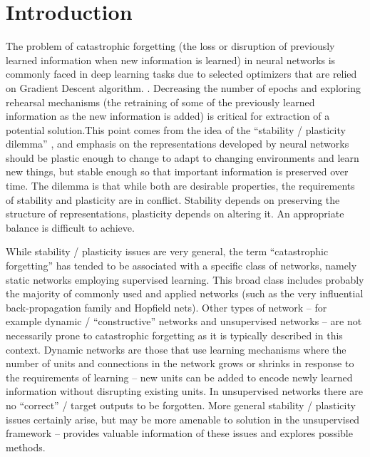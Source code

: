 \documentclass{article}
\begin{document}
\section{Introduction}
The problem of catastrophic forgetting (the loss or disruption of previously learned information when new information is learned) in neural networks is commonly faced in deep learning tasks due to selected optimizers that are relied on Gradient Descent algorithm. 
\cite{rebuffi2017icarl,hou2019learning,kang2022class}. Decreasing the number of epochs and exploring rehearsal mechanisms (the retraining of some of the previously learned information as the new information is added) is critical for extraction of a potential solution.This point comes from the idea of the “stability / plasticity dilemma” \cite{grossberg1987competitive,carpenter1988art}, and emphasis on the representations developed by neural networks should be plastic enough to change to adapt to changing environments and learn new things, but stable enough so that important information is preserved over time. The dilemma is that while both are desirable properties, the requirements of stability and plasticity are in conflict. Stability depends on preserving the structure of representations, plasticity depends on altering it. An appropriate balance is difficult to achieve.

While stability / plasticity issues are very general, the term “catastrophic forgetting”
has tended to be associated with a specific class of networks, namely static networks
employing supervised learning. This broad class includes probably the majority of
commonly used and applied networks (such as the very influential back-propagation
family and Hopfield nets). Other types of network – for example
dynamic / “constructive” networks and unsupervised networks – are not necessarily
prone to catastrophic forgetting as it is typically described in this context. Dynamic
networks are those that use learning mechanisms where the number of units and
connections in the network grows or shrinks in response to the requirements of
learning \cite{hertz1991introduction} – new units can
be added to encode newly learned information without disrupting existing units. In
unsupervised networks there are no “correct” / target outputs to be forgotten. More
general stability / plasticity issues certainly arise, but may be more amenable to
solution in the unsupervised framework – \cite{gillies1991stability} provides valuable information of these issues and explores possible methods.
\end{document}
